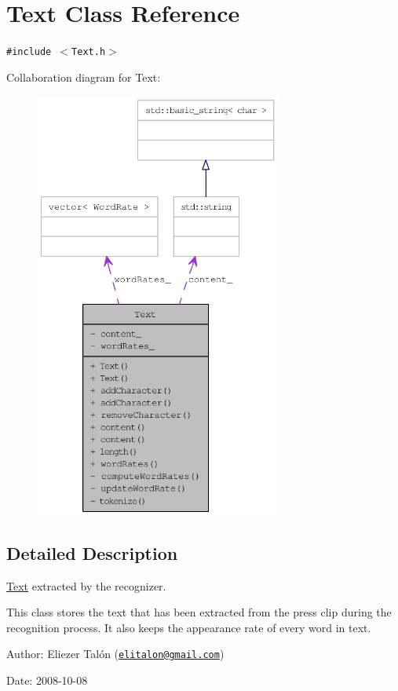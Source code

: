 \hypertarget{class_text}{
\section{Text Class Reference}
\label{class_text}
}
{\tt \#include $<$Text.h$>$}

Collaboration diagram for Text:\nopagebreak
\begin{figure}[H]
\begin{center}
\leavevmode
\includegraphics[height=400pt]{class_text__coll__graph}
\end{center}
\end{figure}


\subsection{Detailed Description}
\hyperlink{class_text}{Text} extracted by the recognizer. 

This class stores the text that has been extracted from the press clip during the recognition process. It also keeps the appearance rate of every word in text.

\begin{Desc}
\item[Author:]Eliezer Talón (\href{mailto:elitalon@gmail.com}{\tt elitalon@gmail.com}) \end{Desc}
\begin{Desc}
\item[Date:]2008-10-08 \end{Desc}


